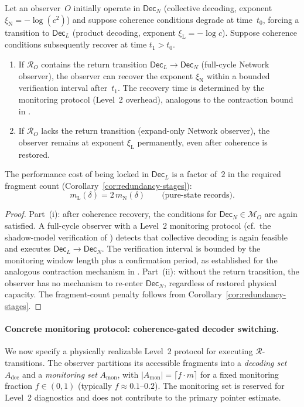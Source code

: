 \begin{proposition}
\label{prop:recovery-qd}
Let an observer~$O$ initially operate in $\mathsf{Dec}_N$ (collective
decoding, exponent $\xi_{\mathrm{N}}=-\log(c^2)$) and suppose
coherence conditions degrade at time~$t_0$, forcing a transition to
$\mathsf{Dec}_L$ (product decoding, exponent $\xi_{\mathrm{L}}=-\log c$).
Suppose coherence conditions subsequently recover at time $t_1>t_0$.
\begin{enumerate}[label=(\roman*)]
\item If $\mathcal{R}_O$ contains the return transition
  $\mathsf{Dec}_L\to\mathsf{Dec}_N$ (full-cycle Network observer), the
  observer can recover the exponent $\xi_{\mathrm{N}}$ within a bounded
  verification interval after~$t_1$.
  The recovery time is determined by the monitoring protocol (Level~2
  overhead), analogous to the contraction bound in
  \citep[Proposition~1(iii)]{WuDLNCompression2026preprint}.
\item If $\mathcal{R}_O$ lacks the return transition (expand-only Network
  observer), the observer remains at exponent $\xi_{\mathrm{L}}$
  permanently, even after coherence is restored.
\end{enumerate}
The performance cost of being locked in $\mathsf{Dec}_L$ is a factor of~$2$
in the required fragment count (Corollary~\ref{cor:redundancy-stages}):
\[
  m_{\mathrm{L}}(\delta) = 2\,m_{\mathrm{N}}(\delta)
  \qquad\text{(pure-state records).}
\]
\end{proposition}

\begin{proof}
Part~(i): after coherence recovery, the conditions for
$\mathsf{Dec}_N\in\mathcal{M}_O$ are again satisfied.
A full-cycle observer with a Level~2 monitoring protocol
(cf.\ the shadow-model verification of
\citep[Sec.~5.1]{WuDLNCompression2026preprint}) detects that collective
decoding is again feasible and executes
$\mathsf{Dec}_L\to\mathsf{Dec}_N$.
The verification interval is bounded by the monitoring window length plus
a confirmation period, as established for the analogous contraction
mechanism in
\citep[Proposition~1(iii)]{WuDLNCompression2026preprint}.
Part~(ii): without the return transition, the observer has no mechanism
to re-enter $\mathsf{Dec}_N$, regardless of restored physical capacity.
The fragment-count penalty follows from
Corollary~\ref{cor:redundancy-stages}.
\end{proof}


\paragraph{Concrete monitoring protocol: coherence-gated decoder switching.}
\label{par:monitoring-protocol}
We now specify a physically realizable Level~2 protocol for executing
$\mathcal{R}$-transitions.
The observer partitions its accessible fragments into a \emph{decoding
set} $A_{\mathrm{dec}}$ and a \emph{monitoring set}
$A_{\mathrm{mon}}$, with $|A_{\mathrm{mon}}|=\lceil f\cdot m\rceil$
for a fixed monitoring fraction $f\in(0,1)$ (typically $f\approx 0.1$--$0.2$).
The monitoring set is reserved for Level~2 diagnostics and does not
contribute to the primary pointer estimate.

